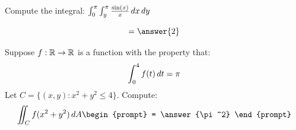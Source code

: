 \documentclass{ximera}
\begin{document}
\begin{problem}
  Compute the integral: $\int_0^\pi \int_y^\pi \frac{\sin(x)}{x}\mathop{}\!d x \mathop{}\!d y$
  \begin{prompt}
    \[
    =\answer{2}
    \]
  \end{prompt}
  \vfill
\end{problem}

\begin{problem}
  Suppose $f:\mathbb R\to\mathbb R$ is a function with the property that:
  \[
  \int_0^4 f(t) \mathop{}\!d t = \pi
  \]
  Let $C = \{(x,y): x^2+y^2 \le 4\}$. Compute:
  \[
  \iint_C f(x^2 + y^2) \d A
  \begin{prompt}
    = \answer{\pi^2}
      \end{prompt}
  \]
  \vfill
\end{problem}
\end{document}
